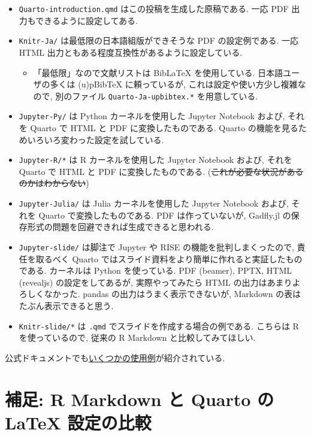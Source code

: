 \documentclass[
  letterpaper,
  DIV=11,
  pandoc,
  ja=standard,
  jafont=noto-otf]{bxjsarticle}
\providecommand{\tightlist}{%
  \setlength{\itemsep}{0pt}\setlength{\parskip}{0pt}}
\begin{document}
\begin{itemize}
\tightlist
\item
  \texttt{Quarto-introduction.qmd} はこの投稿を生成した原稿である. 一応
  PDF 出力もできるように設定してある.
\item
  \texttt{Knitr-Ja/} は最低限の日本語組版ができそうな PDF
  の設定例である. 一応 HTML
  出力ともある程度互換性があるように設定している.

  \begin{itemize}
  \tightlist
  \item
    「最低限」なので文献リストは BibLaTeX を使用している.
    日本語ユーザの多くは (u)pBibTeX に頼っているが,
    これは設定や使い方少し複雑なので, 別のファイル
    \texttt{Quarto-Ja-upbibtex.*} を用意している.
  \end{itemize}
\item
  \texttt{Jupyter-Py/} は Python カーネルを使用した Jupyter Notebook
  および, それを Quarto で HTML と PDF に変換したものである. Quarto
  の機能を見るためいろいろ変わった設定を試している.
\item
  \texttt{Jupyter-R/*} は R カーネルを使用した Jupyter Notebook および,
  それを Quarto で HTML と PDF に変換したものである.
  (\sout{これが必要な状況があるのかはわからない})
\item
  \texttt{Jupyter-Julia/} は Julia カーネルを使用した Jupyter Notebook
  および, それを Quarto で変換したものである. PDF は作っていないが,
  Gadfly.jl の保存形式の問題を回避できれば生成できると思われる.
\item
  \texttt{Jupyter-slide/} は脚注で Jupyter や RISE
  の機能を批判しまくったので, 責任を取るべく Quarto
  ではスライド資料をより簡単に作れると実証したものである. カーネルは
  Python を使っている. PDF (beamer), PPTX, HTML (revealjs)
  の設定をしてあるが, 実際やってみたら HTML
  の出力はあまりよろしくなかった. pandas の出力はうまく表示できないが,
  Markdown の表はたぶん表示できると思う.
\item
  \texttt{Knitr-slide/*} は \texttt{.qmd}
  でスライドを作成する場合の例である. こちらは R を使っているので,
  従来の R Markdown と比較してみてほしい.
\end{itemize}

公式ドキュメントでも\href{https://quarto.org/docs/gallery/}{いくつかの使用例}が紹介されている.

\hypertarget{ux88dcux8db3-r-markdown-ux3068-quarto-ux306e-latex-ux8a2dux5b9aux306eux6bd4ux8f03}{%
\section{補足: R Markdown と Quarto の LaTeX
設定の比較}\label{ux88dcux8db3-r-markdown-ux3068-quarto-ux306e-latex-ux8a2dux5b9aux306eux6bd4ux8f03}}
\end{document}
